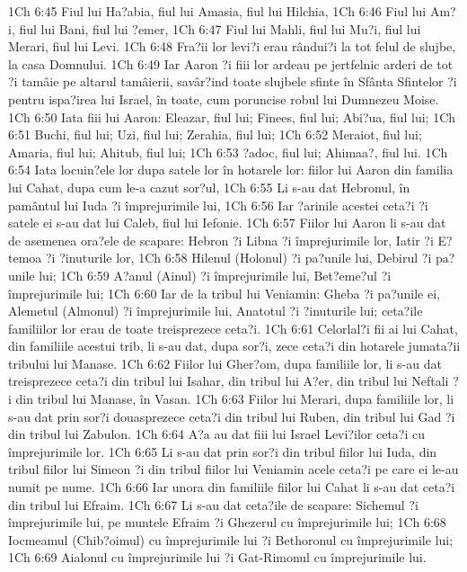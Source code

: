 1Ch 6:45  Fiul lui Ha?abia, fiul lui Amasia, fiul lui Hilchia,
1Ch 6:46  Fiul lui Am?i, fiul lui Bani, fiul lui ?emer,
1Ch 6:47  Fiul lui Mahli, fiul lui Mu?i, fiul lui Merari, fiul lui Levi.
1Ch 6:48  Fra?ii lor levi?i erau rândui?i la tot felul de slujbe, la casa Domnului.
1Ch 6:49  Iar Aaron ?i fiii lor ardeau pe jertfelnic arderi de tot ?i tamâie pe altarul tamâierii, savâr?ind toate slujbele sfinte în Sfânta Sfintelor ?i pentru ispa?irea lui Israel, în toate, cum poruncise robul lui Dumnezeu Moise.
1Ch 6:50  Iata fiii lui Aaron: Eleazar, fiul lui; Finees, fiul lui; Abi?ua, fiul lui;
1Ch 6:51  Buchi, fiul lui; Uzi, fiul lui; Zerahia, fiul lui;
1Ch 6:52  Meraiot, fiul lui; Amaria, fiul lui; Ahitub, fiul lui;
1Ch 6:53  ?adoc, fiul lui; Ahimaa?, fiul lui.
1Ch 6:54  Iata locuin?ele lor dupa satele lor în hotarele lor: fiilor lui Aaron din familia lui Cahat, dupa cum le-a cazut sor?ul,
1Ch 6:55  Li s-au dat Hebronul, în pamântul lui Iuda ?i împrejurimile lui,
1Ch 6:56  Iar ?arinile acestei ceta?i ?i satele ei s-au dat lui Caleb, fiul lui Iefonie.
1Ch 6:57  Fiilor lui Aaron li s-au dat de asemenea ora?ele de scapare: Hebron ?i Libna ?i împrejurimile lor, Iatir ?i E?temoa ?i ?inuturile lor,
1Ch 6:58  Hilenul (Holonul) ?i pa?unile lui, Debirul ?i pa?unile lui;
1Ch 6:59  A?anul (Ainul) ?i împrejurimile lui, Bet?eme?ul ?i împrejurimile lui;
1Ch 6:60  Iar de la tribul lui Veniamin: Gheba ?i pa?unile ei, Alemetul (Almonul) ?i împrejurimile lui, Anatotul ?i ?inuturile lui; ceta?ile familiilor lor erau de toate treisprezece ceta?i.
1Ch 6:61  Celorlal?i fii ai lui Cahat, din familiile acestui trib, li s-au dat, dupa sor?i, zece ceta?i din hotarele jumata?ii tribului lui Manase.
1Ch 6:62  Fiilor lui Gher?om, dupa familiile lor, li s-au dat treisprezece ceta?i din tribul lui Isahar, din tribul lui A?er, din tribul lui Neftali ?i din tribul lui Manase, în Vasan.
1Ch 6:63  Fiilor lui Merari, dupa familiile lor, li s-au dat prin sor?i douasprezece ceta?i din tribul lui Ruben, din tribul lui Gad ?i din tribul lui Zabulon.
1Ch 6:64  A?a au dat fiii lui Israel Levi?ilor ceta?i cu împrejurimile lor.
1Ch 6:65  Li s-au dat prin sor?i din tribul fiilor lui Iuda, din tribul fiilor lui Simeon ?i din tribul fiilor lui Veniamin acele ceta?i pe care ei le-au numit pe nume.
1Ch 6:66  Iar unora din familiile fiilor lui Cahat li s-au dat ceta?i din tribul lui Efraim.
1Ch 6:67  Li s-au dat ceta?ile de scapare: Sichemul ?i împrejurimile lui, pe muntele Efraim ?i Ghezerul cu împrejurimile lui;
1Ch 6:68  Iocmeamul (Chib?oimul) cu împrejurimile lui ?i Bethoronul cu împrejurimile lui;
1Ch 6:69  Aialonul cu împrejurimile lui ?i Gat-Rimonul cu împrejurimile lui.
